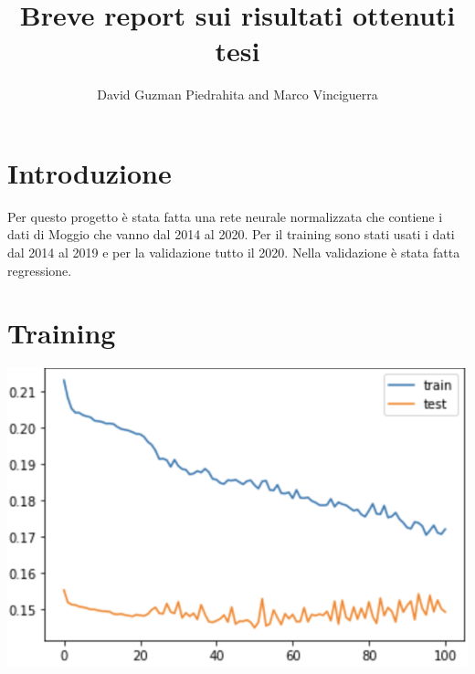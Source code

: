 \documentclass{article}
\title{Breve report sui risultati ottenuti tesi}
\author{David Guzman Piedrahita and Marco Vinciguerra}
\begin{document}
\maketitle        
\section{Introduzione}
Per questo progetto è stata fatta una rete neurale normalizzata
che contiene i dati di Moggio che vanno dal 2014 al 2020.
Per il training sono stati usati i dati dal 2014 al 2019 e per la 
validazione tutto il 2020. 
Nella validazione è stata fatta regressione.
\section{Training}
\includegraphics[scale = 0.5]{Immagini/Training.PNG}
\end{document}
